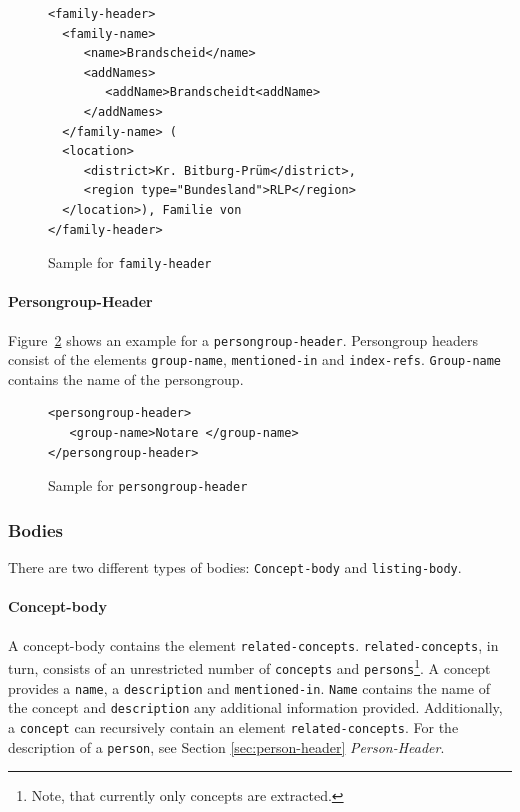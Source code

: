 \begin{figure}[H]
\centering
\begin{verbatim}
<family-header>
  <family-name>
     <name>Brandscheid</name>
     <addNames>
        <addName>Brandscheidt<addName>       
     </addNames>
  </family-name> (
  <location>
     <district>Kr. Bitburg-Prüm</district>, 
     <region type="Bundesland">RLP</region>
  </location>), Familie von 
</family-header>
\end{verbatim}
\caption{Sample for \texttt{family-header}}
\label{fig:family-header-xml}
\end{figure}

\paragraph{Persongroup-Header}
Figure~\ref{fig:persongroup-header-xml} shows an example for a \texttt{persongroup-header}. Persongroup headers consist of the elements \texttt{group-name}, \texttt{mentioned-in} and \texttt{index-refs}. \texttt{Group-name} contains the name of the persongroup.

\begin{figure}[H]
\centering
\begin{verbatim}
<persongroup-header>
   <group-name>Notare </group-name>
</persongroup-header>
\end{verbatim}
\caption{Sample for \texttt{persongroup-header}}
\label{fig:persongroup-header-xml}
\end{figure}

\subsubsection{Bodies}
There are two different types of bodies: \texttt{Concept-body} and \texttt{listing-body}.

\paragraph{Concept-body}
A concept-body contains the element \texttt{related-concepts}. \texttt{related-concepts}, in turn, consists of an unrestricted number of \texttt{concepts} and \texttt{persons}\footnote{Note, that currently only concepts are extracted.}. A concept provides a \texttt{name}, a \texttt{description} and \texttt{mentioned-in}. \texttt{Name} contains the name of the concept and \texttt{description} any additional information provided. Additionally, a \texttt{concept} can recursively contain an element \texttt{related-concepts}. For the description of a \texttt{person}, see Section \ref{sec:person-header} \textit{Person-Header}.


